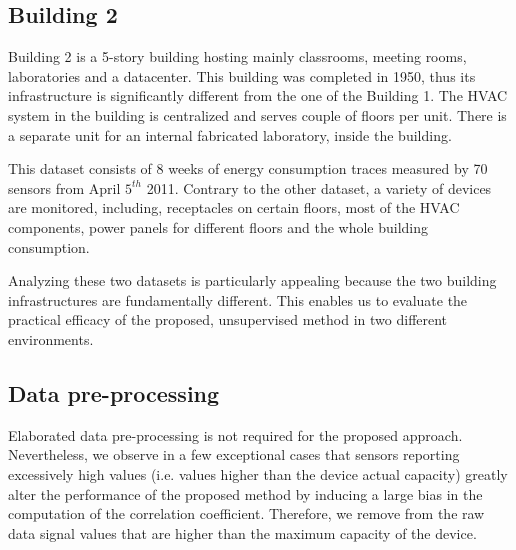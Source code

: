
\subsection{Building 2}
Building 2 is a 5-story building hosting mainly classrooms, meeting rooms, laboratories and a datacenter.
This building was completed in 1950, thus its infrastructure is significantly different from the one of the Building 1.
The HVAC system in the building is centralized and serves couple of floors per unit.
There is a separate unit for an internal fabricated laboratory, inside the building.

This dataset consists of 8 weeks of energy consumption traces measured by 70 sensors from April $5^{th}$ 2011.
Contrary to the other dataset, a variety of devices are monitored, including, receptacles on certain floors, most of the HVAC components, 
 power panels for different floors and the whole building consumption.

Analyzing these two datasets is particularly appealing because the two building infrastructures are fundamentally different. 
This enables us to evaluate the practical efficacy of the proposed, unsupervised method in two different environments.


\subsection{Data pre-processing}
Elaborated data pre-processing is not required for the proposed approach.
Nevertheless, we observe in a few exceptional cases that sensors reporting excessively high values (i.e. values higher than the device actual capacity) greatly alter the performance of the proposed method by inducing a large bias in the computation of the correlation coefficient.
Therefore, we remove from the raw data signal values that are higher than the maximum capacity of the device.


